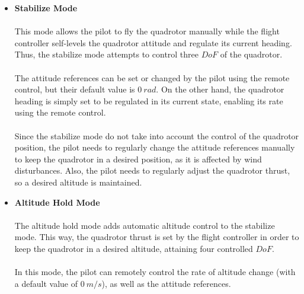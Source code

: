 \begin{itemize}
\item \textbf{Stabilize Mode}\\\\
This mode allows the pilot to fly the quadrotor manually while the flight controller self-levels the quadrotor attitude and regulate its current heading. Thus, the stabilize mode attempts to control three $DoF$ of the quadrotor.\\\\
The attitude references can be set or changed by the pilot using the remote control, but their default value is $0\ rad$. On the other hand, the quadrotor heading is simply set to be regulated in its current state, enabling its rate using the remote control.
\\\\
Since the stabilize mode do not take into account the control of the quadrotor position, the pilot needs to regularly change the attitude references manually to keep the quadrotor in a desired position, as it is affected by wind disturbances. Also, the pilot needs to regularly adjust the quadrotor thrust, so a desired altitude is maintained.

\item \textbf{Altitude Hold Mode}\\\\
The altitude hold mode adds automatic altitude control to the stabilize mode. This way, the quadrotor thrust is set by the flight controller in order to keep the quadrotor in a desired altitude, attaining four controlled $DoF$.
\\\\
In this mode, the pilot can remotely control the rate of altitude change (with a default value of $0\ m/s$), as well as the attitude references.


\end{itemize}
